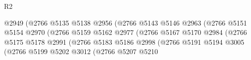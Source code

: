 \begin{lexlean}{R2}
\begin{coremodule}
                                                  @2949
                                                  (@2766
                                                    @5135
                                                    @5138
                                                    @2956
                                                    (@2766
                                                      @5143
                                                      @5146
                                                      @2963
                                                      (@2766
                                                        @5151
                                                        @5154
                                                        @2970
                                                        (@2766
                                                          @5159
                                                          @5162
                                                          @2977
                                                          (@2766
                                                            @5167
                                                            @5170
                                                            @2984
                                                            (@2766
                                                              @5175
                                                              @5178
                                                              @2991
                                                              (@2766
                                                                @5183
                                                                @5186
                                                                @2998
                                                                (@2766
                                                                  @5191
                                                                  @5194
                                                                  @3005
                                                                  (@2766
                                                                    @5199
                                                                    @5202
                                                                    @3012
                                                                    (@2766
                                                                      @5207
                                                                      @5210

\end{coremodule}
\end{lexlean}
